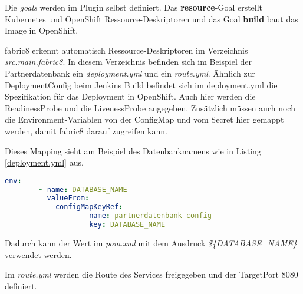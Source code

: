 Die \textit{goals} werden im Plugin selbst definiert. Das \textbf{resource}-Goal erstellt Kubernetes und OpenShift Ressource-Deskriptoren und das Goal \textbf{build} baut das Image in OpenShift.

fabric8 erkennt automatisch Ressource-Deskriptoren im Verzeichnis \textit{src.main.fabric8}. In diesem Verzeichnis befinden sich im Beispiel der Partnerdatenbank ein \textit{deployment.yml} und ein \textit{route.yml}. Ähnlich zur DeploymentConfig beim Jenkins Build befindet sich im deployment.yml die Spezifikation für das Deployment in OpenShift. Auch hier werden die ReadinessProbe und die LivenessProbe angegeben. Zusätzlich müssen auch noch die Environment-Variablen von der ConfigMap und vom Secret hier gemappt werden, damit fabric8 darauf zugreifen kann. 

Dieses Mapping sieht am Beispiel des Datenbanknamens wie in Listing \ref{deployment.yml} aus.
\begin{lstlisting}[language=yml, caption=deployment.yml, label=deployment.yml]
	env:
		- name: DATABASE_NAME
		  valueFrom:
		  	configMapKeyRef:
					name: partnerdatenbank-config
					key: DATABASE_NAME
\end{lstlisting}
Dadurch kann der Wert im \textit{pom.xml} mit dem Ausdruck \textit{\$\{DATABASE\_NAME\}} verwendet werden. 

Im \textit{route.yml} werden die Route des Services freigegeben und der TargetPort 8080 definiert.  